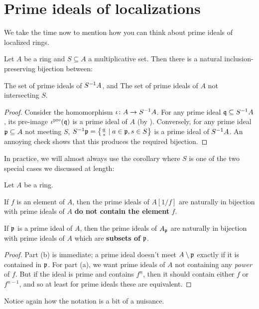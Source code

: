 \section{Prime ideals of localizations}
We take the time now to mention how you can
think about prime ideals of localized rings.
\begin{proposition}
	Let $A$ be a ring and $S \subseteq A$ a multiplicative set.
	Then there is a natural inclusion-preserving bijection between:
	\begin{itemize}
		\ii The set of prime ideals of $S^{-1} A$, and
		\ii The set of prime ideals of $A$ not intersecting $S$.
	\end{itemize}
\end{proposition}
\begin{proof}
	Consider the homomorphism $\iota \colon A \to S^{-1} A$.
	For any prime ideal $\mathfrak q \subseteq S^{-1} A$,
	its pre-image $\iota^{\text{pre}}(\mathfrak q)$ is a prime ideal of $A$
	(by ).
	Conversely, for any prime ideal $\mathfrak p \subseteq A$
	not meeting $S$,
	$S^{-1} \mathfrak p = \left\{ \frac{a}{s} \mid a \in \mathfrak p, s \in S \right\}$
	is a prime ideal of $S^{-1} A$.
	An annoying check shows that this produces the required bijection.
\end{proof}
In practice, we will almost always use the corollary
where $S$ is one of the two special cases we discussed at length:
\begin{corollary}
	Let $A$ be a ring.
	\begin{enumerate}[(a)]
		\ii If $f$ is an element of $A$,
		then the prime ideals of $A[1/f]$ are naturally
		in bijection with prime ideals of $A$
		\textbf{do not contain the element} $f$.

		\ii If $\mathfrak p$ is a prime ideal of $A$,
		then the prime ideals of $A_\mathfrak p$ are naturally
		in bijection with prime ideals of $A$
		which are \textbf{subsets of} $\mathfrak p$.
	\end{enumerate}
\end{corollary}
\begin{proof}
	Part (b) is immediate; a prime ideal doesn't meet $A \setminus \mathfrak p$
	exactly if it is contained in $\mathfrak p$.
	For part (a), we want prime ideals of $A$ not containing
	any \emph{power} of $f$.
	But if the ideal is prime and contains $f^n$,
	then it should contain either $f$ or $f^{n-1}$,
	and so at least for prime ideals these are equivalent.
\end{proof}
Notice again how the notation is a bit of a nuisance.
